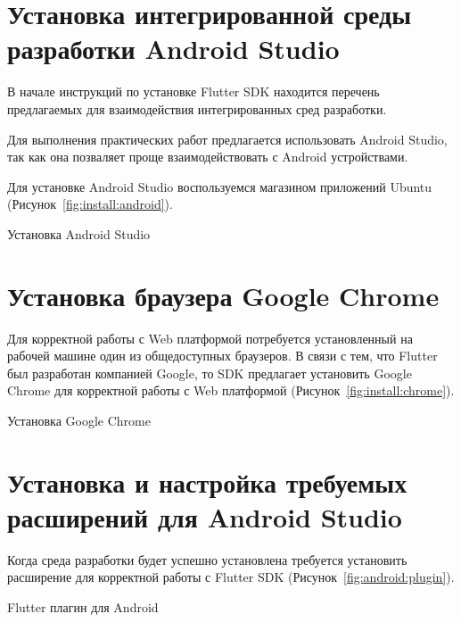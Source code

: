 \section{Установка интегрированной среды разработки Android Studio}

В начале инструкций по установке Flutter SDK находится перечень предлагаемых
для взаимодействия интегрированных сред разработки.\par
Для выполнения практических работ предлагается использовать Android Studio,
так как она позваляет проще взаимодействовать с Android устройствами.\par
Для установке Android Studio воспользуемся магазином приложений Ubuntu
(Рисунок~\ref{fig:install:android}).

\begin{image}
	\caption{Установка Android Studio}
	\label{fig:install:android}
\end{image}

\section{Установка браузера Google Chrome}

Для корректной работы с Web платформой потребуется установленный
на рабочей машине один из общедоступных браузеров.
В связи с тем, что Flutter был разработан компанией Google,
то SDK предлагает установить Google Chrome
для корректной работы с Web платформой (Рисунок~\ref{fig:install:chrome}).

\begin{image}
	\caption{Установка Google Chrome}
	\label{fig:install:chrome}
\end{image}

\section{Установка и настройка требуемых расширений для Android Studio}

Когда среда разработки будет успешно установлена требуется
установить расширение для корректной работы с Flutter SDK
(Рисунок~\ref{fig:android:plugin}).

\begin{image}
	\caption{Flutter плагин для Android}
	\label{fig:android:plugin}
\end{image}


